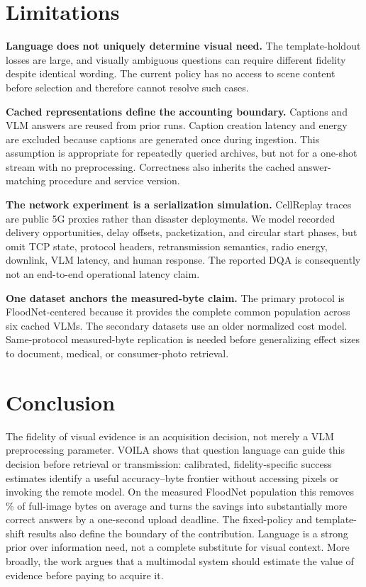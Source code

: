 \documentclass[10pt,conference]{IEEEtran}
\newcommand{\system}{\textsc{VOILA}\xspace}
\begin{document}
\section{Limitations}
\label{sec:limitations}

\textbf{Language does not uniquely determine visual need.}
The template-holdout losses are large, and visually ambiguous questions can
require different fidelity despite identical wording. The current policy has
no access to scene content before selection and therefore cannot resolve such
cases.

\textbf{Cached representations define the accounting boundary.}
Captions and VLM answers are reused from prior runs. Caption creation latency
and energy are excluded because captions are generated once during ingestion.
This assumption is appropriate for repeatedly queried archives, but not for a
one-shot stream with no preprocessing. Correctness also inherits the cached
answer-matching procedure and service version.

\textbf{The network experiment is a serialization simulation.}
CellReplay traces are public 5G proxies rather than disaster deployments. We
model recorded delivery opportunities, delay offsets, packetization, and
circular start phases, but omit TCP state, protocol headers, retransmission
semantics, radio energy, downlink, VLM latency, and human response. The reported
DQA is consequently not an end-to-end operational latency claim.

\textbf{One dataset anchors the measured-byte claim.}
The primary protocol is FloodNet-centered because it provides the complete
common population across six cached VLMs. The secondary datasets use an older
normalized cost model. Same-protocol measured-byte replication is needed
before generalizing effect sizes to document, medical, or consumer-photo
retrieval.

\section{Conclusion}

The fidelity of visual evidence is an acquisition decision, not merely a VLM
preprocessing parameter. \system shows that question language can guide this
decision before retrieval or transmission: calibrated, fidelity-specific
success estimates identify a useful accuracy--byte frontier without accessing
pixels or invoking the remote model. On the measured FloodNet population this
removes \MeanByteReduction\% of full-image bytes on average and turns the
savings into substantially more correct answers by a one-second upload
deadline. The fixed-policy and template-shift results also define the boundary
of the contribution. Language is a strong prior over information need, not a
complete substitute for visual context. More broadly, the work argues that a
multimodal system should estimate the value of evidence before paying to
acquire it.

\clearpage
\begingroup
\let\footnotesize\scriptsize


\endgroup
\end{document}
